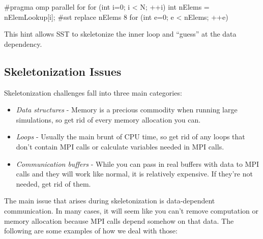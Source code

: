 \begin{CppCode}
#pragma omp parallel for
for (int i=0; i < N; ++i){
  int nElems = nElemLookup[i];
  #sst replace nElems 8
  for (int e=0; e < nElems; ++e){
  }
}
\end{CppCode}
This hint allows SST to skeletonize the inner loop and ``guess'' at the data dependency.



\subsection{Skeletonization Issues}
\label{subsec:skeletonIssues}
Skeletonization challenges fall into three main categories:

\begin{itemize}
\item \textit{Data structures} - Memory is a precious commodity when running large simulations, so get rid of every memory allocation you can.
\item \textit{Loops} - Usually the main brunt of CPU time, so get rid of any loops that don't contain MPI calls or calculate variables needed in MPI calls.
\item \textit{Communication buffers} - While you can pass in real buffers with data to \sstmacro MPI calls and they will work like normal, it is relatively expensive. If they're not needed, get rid of them.
\end{itemize}





The main issue that arises during skeletonization is data-dependent communication.  
In many cases, it will seem like you can't remove computation or memory allocation because MPI calls depend somehow on that data.  
The following are some examples of how we deal with those:

